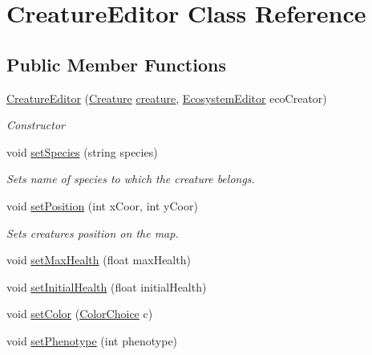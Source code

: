 \hypertarget{class_creature_editor}{}\section{Creature\+Editor Class Reference}
\label{class_creature_editor}
\subsection*{Public Member Functions}
\begin{DoxyCompactItemize}
\item 
\mbox{\hyperlink{class_creature_editor_ad25258b45808b5e140dd76aa7eec7b29}{Creature\+Editor}} (\mbox{\hyperlink{class_creature}{Creature}} \mbox{\hyperlink{class_creature_editor_a2589284f2064a318bd8578acb95f3309}{creature}}, \mbox{\hyperlink{class_ecosystem_editor}{Ecosystem\+Editor}} eco\+Creator)
\begin{DoxyCompactList}\small\item\em Constructor \end{DoxyCompactList}\item 
void \mbox{\hyperlink{class_creature_editor_a25dc6294586118bf7e4ecefeccea2815}{set\+Species}} (string species)
\begin{DoxyCompactList}\small\item\em Sets name of species to which the creature belongs. \end{DoxyCompactList}\item 
void \mbox{\hyperlink{class_creature_editor_af2c3731115defa893138dcb7de00092c}{set\+Position}} (int x\+Coor, int y\+Coor)
\begin{DoxyCompactList}\small\item\em Sets creature\textquotesingle{}s position on the map. \end{DoxyCompactList}\item 
void \mbox{\hyperlink{class_creature_editor_a2a1426689b7276996e550e5c508e9a48}{set\+Max\+Health}} (float max\+Health)
\item 
void \mbox{\hyperlink{class_creature_editor_a2a230941e6db58928582e20704a8d239}{set\+Initial\+Health}} (float initial\+Health)
\item 
void \mbox{\hyperlink{class_creature_editor_a0ef7391c366e987d267d7ba937447146}{set\+Color}} (\mbox{\hyperlink{_creature_editor_8cs_a2d31a955c823bd51aec8f913e263723c}{Color\+Choice}} c)
\item 
void \mbox{\hyperlink{class_creature_editor_a63a9951aa74689237e12cd131cef6e0e}{set\+Phenotype}} (int phenotype)

\end{DoxyCompactItemize}
